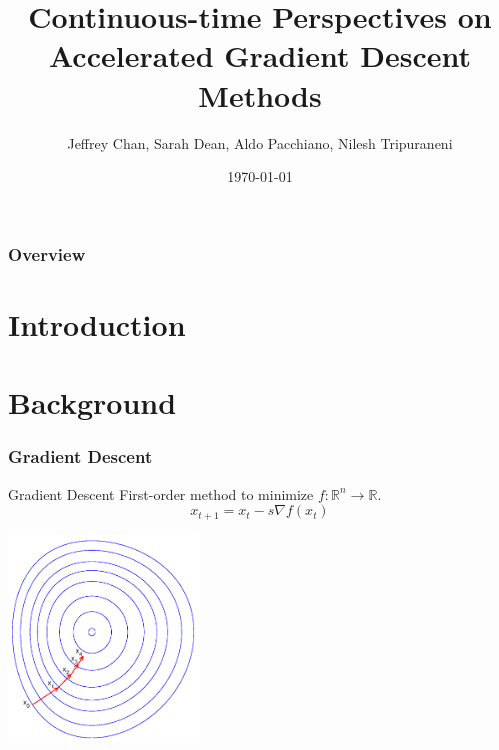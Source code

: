 \documentclass{beamer}
\title[]{Continuous-time Perspectives on Accelerated Gradient Descent Methods} %
\author[Chan, Dean, Pacchiano, Tripuraneni]{Jeffrey Chan, Sarah Dean, Aldo Pacchiano, Nilesh Tripuraneni} %
\institute[UCB] %
{Department of EECS,
University of California, Berkeley }
\date{\today} %
\begin{document}
\begin{frame}
\titlepage %
\end{frame}

\begin{frame}
\frametitle{Overview} %
\tableofcontents %
\end{frame}


\section{Introduction} %

\section{Background}





\begin{frame}
\frametitle{ Gradient Descent }
\begin{block}{Gradient Descent}
First-order method to minimize $f:\mathbb{R}^n \rightarrow \mathbb{R}$.
\begin{equation}
    x_{t+1} = x_t - s \nabla f(x_t)
\end{equation}
\end{block}

\begin{center}
\includegraphics[width=2in]{SourceFiles/plots/Gradient_descent.eps}
\end{center}
\end{frame}
\end{document}
